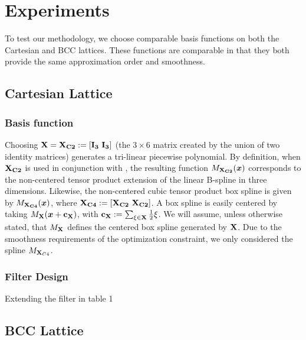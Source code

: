 \section{Experiments}
To test our methodology, we choose comparable basis functions on both the Cartesian and BCC lattices. 
These functions are comparable in that they both provide the same approximation order and smoothness. 

\subsection{Cartesian Lattice}
\subsubsection{Basis function}
Choosing $\mathbf{\mathbf{X} = \mathbf{X}_{C2} := \left[ I_3  \ I_3 \right]}$ (the $3 \times 6$ matrix created by the union of two identity matrices) generates a tri-linear piecewise polynomial. 
By definition, when $\mathbf{\mathbf{X}_{C2}}$ is used in conjunction with , the resulting function $M_\mathbf{\mathbf{X}_{C2}}(\boldsymbol{x})$ corresponds to the non-centered tensor product extension of the linear B-spline in three dimensions. 
Likewise, the non-centered cubic tensor product box spline is given by $M_\mathbf{\mathbf{X}_{C4}}(\boldsymbol{x})$, where $\mathbf{\mathbf{X}_{C4} := \left[ \mathbf{X}_{C2} \ \mathbf{X}_{C2} \right]}$. 
A box spline is easily centered by taking $M_\mathbf{\mathbf{X}}(\boldsymbol{x} + \mathbf{c_{\mathbf{X}}})$, with $\mathbf{c_{\mathbf{X}}}:=\sum_{\xi \in \mathbf{\mathbf{X}}} \frac{1}{2}\xi$. 
We will assume, unless otherwise stated, that $M_\mathbf{\mathbf{X}}$ defines the centered box spline generated by $\mathbf{\mathbf{X}}$. 
Due to the smoothness requirements of the optimization constraint, we only considered the spline $M_{\mathbf{X}_{C4}}$.

\subsubsection{Filter Design}
Extending the filter in table 1

\subsection{BCC Lattice}

